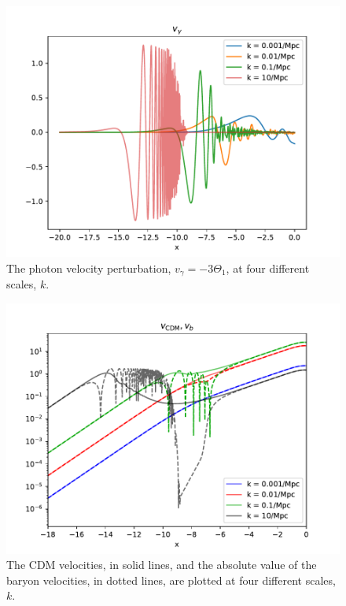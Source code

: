 \documentclass{aa}
\begin{document}
\begin{figure}[h!]
   \includegraphics[scale=0.6]{../figures/milestone3/v_gamma.pdf}
   \caption{The photon velocity perturbation, $v_\gamma=-3\Theta_1$, at four different scales, $k$.}\label{fig:v_gamma}
\end{figure}

\begin{figure}[h!]
   \includegraphics[scale=0.6]{../figures/milestone3/v_cdm_v_b.pdf}
   \caption{The CDM velocities, in solid lines, and the absolute value of the baryon velocities,
   in dotted lines, are plotted at four different scales, $k$.}\label{fig:v_cdm_v_b}
\end{figure}
\end{document}
